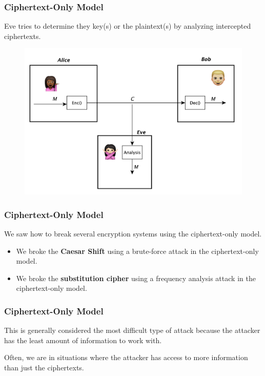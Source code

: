 \documentclass{beamer}
\newcommand{\<}{\langle}
\renewcommand{\>}{\rangle}
\begin{document}
\begin{frame}
\frametitle{Ciphertext-Only Model}

Eve tries to determine they key(s) or the plaintext(s) by analyzing intercepted ciphertexts.

\begin{figure}
\includegraphics[scale=.4]{IMG/attack1.pdf}
\end{figure}
\end{frame}


\begin{frame}
\frametitle{Ciphertext-Only Model}

We saw how to break several encryption systems using the ciphertext-only model.
\begin{itemize}
\item We broke the \textbf{Caesar Shift} using a brute-force attack in the ciphertext-only model.
\item We broke the \textbf{substitution cipher} using a frequency analysis attack in the ciphertext-only model. 
\end{itemize}
\end{frame}


\begin{frame}
\frametitle{Ciphertext-Only Model}

This is generally considered the most difficult type of attack because the attacker has the least amount of information to work with. \newline

Often, we are in situations where the attacker has access to more information than just the ciphertexts. 
\end{frame}
\end{document}
